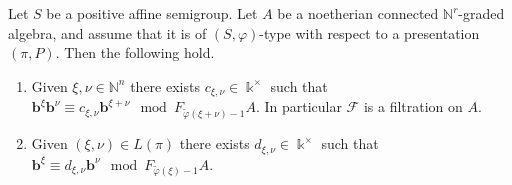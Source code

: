 \documentclass[11pt,fleqn]{article}
\newcommand\NN{\mathbb N}
\renewcommand\phi{\varphi}
\newcommand\F{\mathcal F}
\newcommand\tphi{\tilde \phi}
\renewcommand\b{\mathbf b}
\renewcommand\k{\Bbbk}
\begin{document}
\begin{Lemma*}
Let $S$ be a positive affine semigroup.
Let $A$ be a noetherian connected $\NN^r$-graded algebra, and assume that it is of
$(S, \phi)$-type with respect to a presentation $(\pi, P)$. Then the following hold.
\begin{enumerate}
\item \label{filtration}
Given $\xi, \nu \in \NN^n$ there exists $c_{\xi, \nu} \in \k^\times$ such that $\b^\xi
\b^\nu \equiv c_{\xi, \nu}\b^{\xi + \nu} \mod F_{\tphi(\xi + \nu) - 1}A$. In particular 
$\F$ is a filtration on $A$.

\item \label{straight}
Given $(\xi, \nu) \in L(\pi)$ there exists $d_{\xi, \nu} 
\in \k^\times$ such that $\b^\xi \equiv d_{\xi, \nu} \b^\nu \mod F_{\tphi(\xi) - 1} A$.
\end{enumerate}
\end{Lemma*}
\end{document}
